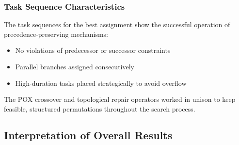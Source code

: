 \documentclass[12pt,a4paper]{article}
\begin{document}
\subsubsection{Task Sequence Characteristics}

The task sequences for the best assignment show the successful operation of precedence-preserving mechanisms:

\begin{itemize}
    \item No violations of predecessor or successor constraints
    \item Parallel branches assigned consecutively
    \item High-duration tasks placed strategically to avoid overflow
\end{itemize}

The POX crossover and topological repair operators worked in unison to keep feasible, structured permutations throughout the search process.

\par
\subsection{Interpretation of Overall Results}


\begin{table}[H]
\centering
\caption{GA Statistics for Solved Benchmark Instances}
\label{tab:ga_performance_summary}


\end{table}
\end{document}
